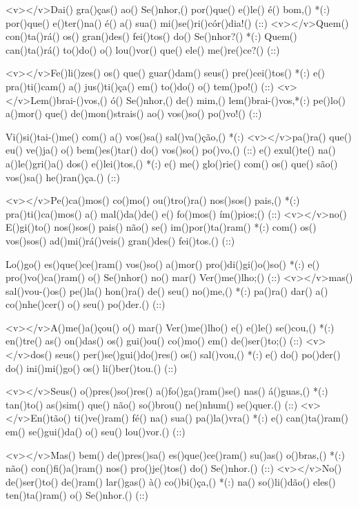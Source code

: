 <v></v>Dai() gra()ças() ao() Se()nhor,() por()que() e()le() é() bom,() *(:)
por()que() e()ter()na() é() a() sua() mi()se()ri()cór()dia!() (::)
<v></v>Quem() con()ta()rá() os() gran()des() fei()tos() do() Se()nhor?() *(:)
Quem() can()ta()rá() to()do() o() lou()vor() que() ele() me()re()ce?() (::)

<v></v>Fe()li()zes() os() que() guar()dam() seus() pre()cei()tos() *(:)
e() pra()ti()cam() a() jus()ti()ça() em() to()do() o() tem()po!() (::)
<v></v>Lem()brai-()vos,() ó() Se()nhor,() de() mim,() lem()brai-()vos,*(:)
pe()lo() a()mor() que() de()mon()strais() ao() vos()so() po()vo!() (::)

Vi()si()tai-()me() com() a() vos()sa() sal()va()ção,() *(:)
<v></v>pa()ra() que() eu() ve()ja() o() bem()es()tar() do() vos()so() po()vo,() (::)
e() exul()te() na() a()le()gri()a() dos() e()lei()tos,() *(:)
e() me() glo()rie() com() os() que() são() vos()sa() he()ran()ça.() (::)

<v></v>Pe()ca()mos() co()mo() ou()tro()ra() nos()sos() pais,() *(:)
pra()ti()ca()mos() a() mal()da()de() e() fo()mos() ím()pios;() (::)
<v></v>no() E()gi()to() nos()sos() pais() não() se() im()por()ta()ram() *(:)
com() os() vos()sos() ad()mi()rá()veis() gran()des() fei()tos.() (::)

Lo()go() es()que()ce()ram() vos()so() a()mor() pro()di()gi()o()so() *(:)
e() pro()vo()ca()ram() o() Se()nhor() no() mar() Ver()me()lho;() (::)
<v></v>mas() sal()vou-()os() pe()la() hon()ra() de() seu() no()me,() *(:)
pa()ra() dar() a() co()nhe()cer() o() seu() po()der.() (::)

<v></v>A()me()a()çou() o() mar() Ver()me()lho() e() e()le() se()cou,() *(:)
en()tre() as() on()das() os() gui()ou() co()mo() em() de()ser()to;() (::)
<v></v>dos() seus() per()se()gui()do()res() os() sal()vou,() *(:)
e() do() po()der() do() ini()mi()go() os() li()ber()tou.() (::)

<v></v>Seus() o()pres()so()res() a()fo()ga()ram()se() nas() á()guas,() *(:)
tan()to() as()sim() que() não() so()brou() ne()nhum() se()quer.() (::)
<v></v>En()tão() ti()ve()ram() fé() na() sua() pa()la()vra() *(:)
e() can()ta()ram() em() se()gui()da() o() seu() lou()vor.() (::)

<v></v>Mas() bem() de()pres()sa() es()que()ce()ram() su()as() o()bras,() *(:)
não() con()fi()a()ram() nos() pro()je()tos() do() Se()nhor.() (::)
<v></v>No() de()ser()to() de()ram() lar()gas() à() co()bi()ça,() *(:)
na() so()li()dão() eles() ten()ta()ram() o() Se()nhor.() (::)

